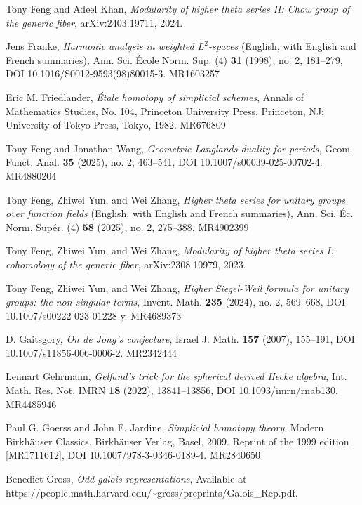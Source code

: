 \begin{refs}
\item[{[FK24]}] Tony Feng and Adeel Khan, \emph{Modularity of higher theta series II: Chow group of the generic fiber}, arXiv:2403.19711, 2024.
\item[{[Fra98]}] Jens Franke, \emph{Harmonic analysis in weighted $L^2$-spaces} (English, with English and French summaries), Ann. Sci. \'Ecole Norm. Sup. (4) \textbf{31} (1998), no. 2, 181--279, DOI 10.1016/S0012-9593(98)80015-3. MR1603257
\item[{[Fri82]}] Eric M. Friedlander, \emph{\'Etale homotopy of simplicial schemes}, Annals of Mathematics Studies, No. 104, Princeton University Press, Princeton, NJ; University of Tokyo Press, Tokyo, 1982. MR676809
\item[{[FW25]}] Tony Feng and Jonathan Wang, \emph{Geometric Langlands duality for periods}, Geom. Funct. Anal. \textbf{35} (2025), no. 2, 463--541, DOI 10.1007/s00039-025-00702-4. MR4880204
\item[{[FYZ21]}] Tony Feng, Zhiwei Yun, and Wei Zhang, \emph{Higher theta series for unitary groups over function fields} (English, with English and French summaries), Ann. Sci. \'Ec. Norm. Sup\'er. (4) \textbf{58} (2025), no. 2, 275--388. MR4902399
\item[{[FYZ23]}] Tony Feng, Zhiwei Yun, and Wei Zhang, \emph{Modularity of higher theta series I: cohomology of the generic fiber}, arXiv:2308.10979, 2023.
\item[{[FYZ24]}] Tony Feng, Zhiwei Yun, and Wei Zhang, \emph{Higher Siegel-Weil formula for unitary groups: the non-singular terms}, Invent. Math. \textbf{235} (2024), no. 2, 569--668, DOI 10.1007/s00222-023-01228-y. MR4689373
\item[{[Gai07]}] D. Gaitsgory, \emph{On de Jong's conjecture}, Israel J. Math. \textbf{157} (2007), 155--191, DOI 10.1007/s11856-006-0006-2. MR2342444
\item[{[Geh22]}] Lennart Gehrmann, \emph{Gelfand's trick for the spherical derived Hecke algebra}, Int. Math. Res. Not. IMRN \textbf{18} (2022), 13841--13856, DOI 10.1093/imrn/rnab130. MR4485946
\item[{[GJ09]}] Paul G. Goerss and John F. Jardine, \emph{Simplicial homotopy theory}, Modern Birkh\"auser Classics, Birkh\"auser Verlag, Basel, 2009. Reprint of the 1999 edition [MR1711612], DOI 10.1007/978-3-0346-0189-4. MR2840650
\item[{[Gro]}] Benedict Gross, \emph{Odd galois representations}, Available at https://people.math.harvard.edu/\textasciitilde gross/preprints/Galois\_Rep.pdf.

\end{refs}
